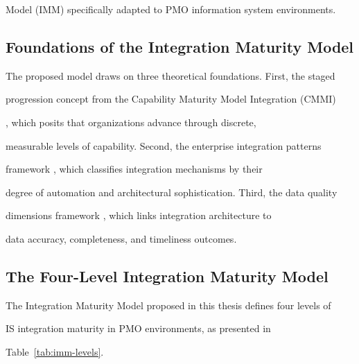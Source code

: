 Model (IMM) specifically adapted to PMO information system environments. 

 

\subsection{Foundations of the Integration Maturity Model} 

The proposed model draws on three theoretical foundations. First, the staged  

progression concept from the Capability Maturity Model Integration (CMMI)  

\cite{paulk1993}, which posits that organizations advance through discrete,  

measurable levels of capability. Second, the enterprise integration patterns  

framework \cite{hohpe2004}, which classifies integration mechanisms by their  

degree of automation and architectural sophistication. Third, the data quality  

dimensions framework \cite{dama2017}, which links integration architecture to  

data accuracy, completeness, and timeliness outcomes. 

 

\subsection{The Four-Level Integration Maturity Model} 

The Integration Maturity Model proposed in this thesis defines four levels of  

IS integration maturity in PMO environments, as presented in  

Table~\ref{tab:imm-levels}. 

  

